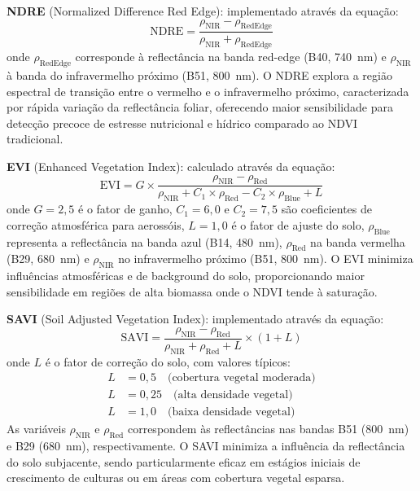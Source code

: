 \textbf{NDRE} (Normalized Difference Red Edge): implementado através da equação:
\begin{equation}
\text{NDRE} = \frac{\rho_{\text{NIR}} - \rho_{\text{RedEdge}}}{\rho_{\text{NIR}} + \rho_{\text{RedEdge}}}
\label{eq:ndre}
\end{equation}
onde $\rho_{\text{RedEdge}}$ corresponde à reflectância na banda red-edge (B40, 740~nm) 
e $\rho_{\text{NIR}}$ à banda do infravermelho próximo (B51, 800~nm). O NDRE 
explora a região espectral de transição entre o vermelho e o infravermelho próximo, 
caracterizada por rápida variação da reflectância foliar, oferecendo maior 
sensibilidade para detecção precoce de estresse nutricional e hídrico comparado 
ao NDVI tradicional.

\textbf{EVI} (Enhanced Vegetation Index): calculado através da equação:
\begin{equation}
\text{EVI} = G \times \frac{\rho_{\text{NIR}} - \rho_{\text{Red}}}{\rho_{\text{NIR}} + C_1 \times \rho_{\text{Red}} - C_2 \times \rho_{\text{Blue}} + L}
\label{eq:evi}
\end{equation}
onde $G = 2{,}5$ é o fator de ganho, $C_1 = 6{,}0$ e $C_2 = 7{,}5$ são coeficientes 
de correção atmosférica para aerossóis, $L = 1{,}0$ é o fator de ajuste do solo, 
$\rho_{\text{Blue}}$ representa a reflectância na banda azul (B14, 480~nm), 
$\rho_{\text{Red}}$ na banda vermelha (B29, 680~nm) e $\rho_{\text{NIR}}$ no 
infravermelho próximo (B51, 800~nm). O EVI minimiza influências atmosféricas 
e de background do solo, proporcionando maior sensibilidade em regiões de alta 
biomassa onde o NDVI tende à saturação.

\textbf{SAVI} (Soil Adjusted Vegetation Index): implementado através da equação:
\begin{equation}
\text{SAVI} = \frac{\rho_{\text{NIR}} - \rho_{\text{Red}}}{\rho_{\text{NIR}} + \rho_{\text{Red}} + L} \times (1 + L)
\label{eq:savi}
\end{equation}
onde $L$ é o fator de correção do solo, com valores típicos:
\begin{align}
L &= 0{,}5 \quad \text{(cobertura vegetal moderada)} \nonumber \\
L &= 0{,}25 \quad \text{(alta densidade vegetal)} \nonumber \\
L &= 1{,}0 \quad \text{(baixa densidade vegetal)} \nonumber
\end{align} As variáveis $\rho_{\text{NIR}}$ e $\rho_{\text{Red}}$ 
correspondem às reflectâncias nas bandas B51 (800~nm) e B29 (680~nm), 
respectivamente. O SAVI minimiza a influência da reflectância do solo 
subjacente, sendo particularmente eficaz em estágios iniciais de crescimento 
de culturas ou em áreas com cobertura vegetal esparsa.

